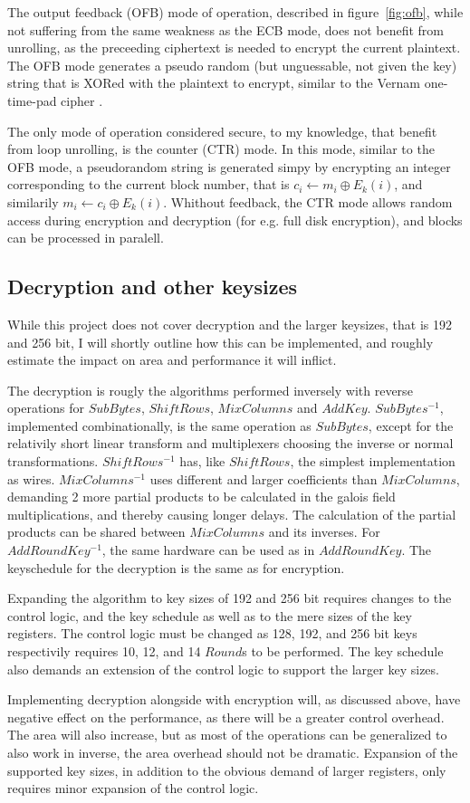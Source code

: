 The output feedback (OFB) mode of operation, described in
figure~\ref{fig:ofb}, while not suffering from the same weakness as
the ECB mode, does not benefit from unrolling, as the preceeding
ciphertext is needed to encrypt the current plaintext. The OFB mode
generates a pseudo random (but unguessable, not given the key) string
that is XORed with the plaintext to encrypt, similar to the Vernam
one-time-pad cipher \cite{vernam}.

The only mode of operation considered secure, to my knowledge, that
benefit from loop unrolling, is the counter (CTR) mode. In this mode,
similar to the OFB mode, a pseudorandom string is generated simpy by
encrypting an integer corresponding to the current block number, that
is $c_i \leftarrow m_i \oplus E_k(i)$, and similarily $m_i \leftarrow
c_i \oplus E_k(i)$. Whithout feedback, the CTR mode allows random
access during encryption and decryption (for e.g. full disk
encryption), and blocks can be processed in paralell.

\subsection{Decryption and other keysizes}

While this project does not cover decryption and the larger keysizes,
that is 192 and 256 bit, I will shortly outline how this can be
implemented, and roughly estimate the impact on area and performance
it will inflict.

The decryption is rougly the algorithms performed inversely with
reverse operations for $SubBytes$, $ShiftRows$, $MixColumns$ and
$AddKey$. $SubBytes^{-1}$, implemented combinationally, is the same
operation as $SubBytes$, except for the relativily short linear
transform and multiplexers choosing the inverse or normal
transformations. $ShiftRows^{-1}$ has, like $ShiftRows$, the simplest
implementation as wires. $MixColumns^{-1}$ uses different and larger
coefficients than $MixColumns$, demanding 2 more partial products to
be calculated in the galois field multiplications, and thereby causing
longer delays. The calculation of the partial products can be shared
between $MixColumns$ and its inverses. For $AddRoundKey^{-1}$, the
same hardware can be used as in $AddRoundKey$. The keyschedule for the
decryption is the same as for encryption.

Expanding the algorithm to key sizes of 192 and 256 bit requires
changes to the control logic, and the key schedule as well as to the
mere sizes of the key registers. The control logic must be changed as
128, 192, and 256 bit keys respectivily requires 10, 12, and 14
$Round$s to be performed. The key schedule also demands an extension
of the control logic to support the larger key sizes.

Implementing decryption alongside with encryption will, as discussed
above, have negative effect on the performance, as there will be a
greater control overhead. The area will also increase, but as most of
the operations can be generalized to also work in inverse, the area
overhead should not be dramatic. Expansion of the supported key sizes,
in addition to the obvious demand of larger registers, only requires
minor expansion of the control logic.


